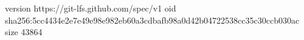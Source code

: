 version https://git-lfs.github.com/spec/v1
oid sha256:5cc4434e2e7e49e98e982eb60a3cdbafb98a0d42b04722538cc35c30ccb030ac
size 43864
